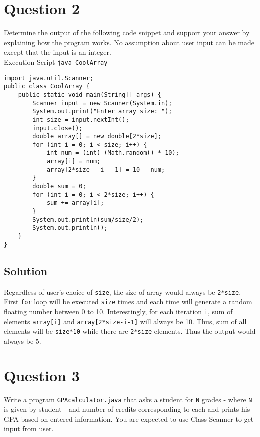 \documentclass[12pt,letterpaper,twoside]{article}
\begin{document}
\section*{Question 2}

Determine the output of the following code snippet and support your answer by explaining how the program works. No assumption about user input can be made except that the input is an integer.\\[10pt]

Execution Script \hfill \texttt{java CoolArray}

\begin{lstlisting}
import java.util.Scanner;
public class CoolArray {
	public static void main(String[] args) {
		Scanner input = new Scanner(System.in);
		System.out.print("Enter array size: ");
		int size = input.nextInt();
		input.close();
		double array[] = new double[2*size];
		for (int i = 0; i < size; i++) {
			int num = (int) (Math.random() * 10);
			array[i] = num;
			array[2*size - i - 1] = 10 - num;
		}
		double sum = 0;
		for (int i = 0; i < 2*size; i++) {
			sum += array[i];
		}
		System.out.println(sum/size/2);
		System.out.println();
	}
}

\end{lstlisting}

\subsection*{Solution}

Regardless of user's choice of \texttt{size}, the size of array would always be \texttt{2*size}. First \texttt{for} loop will be executed \texttt{size} times and each time will generate a random floating number between 0 to 10. Interestingly, for each iteration \texttt{i}, sum of elements \texttt{array[i]} and \texttt{array[2*size-i-1]} will always be 10. Thus, sum of all elements will be \texttt{size*10} while there are \texttt{2*size} elements. Thus the output would always be $5$.

\section*{Question 3}

Write a program \texttt{GPAcalculator.java} that asks a student for \texttt{N} grades - where \texttt{N} is given by student - and number of credits corresponding to each and prints his GPA based on entered information. You are expected to use Class Scanner to get input from user.
\end{document}
